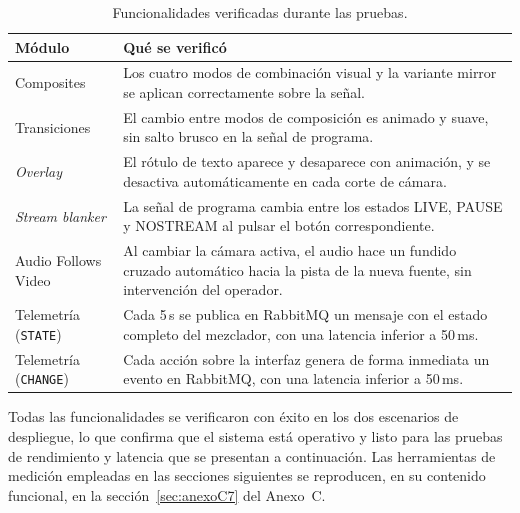 \begin{table}[H]
  \centering
  \caption{Funcionalidades verificadas durante las pruebas.}
  \label{tab:validacion_funcional}
  \small
  \begin{tabular}{|l|p{9cm}|}
    \hline
    \textbf{Módulo} & \textbf{Qué se verificó} \\
    \hline
    Composites
      & Los cuatro modos de combinación visual y la variante mirror se aplican correctamente sobre la señal. \\
    \hline
    Transiciones
      & El cambio entre modos de composición es animado y suave, sin salto brusco en la señal de programa. \\
    \hline
    \textit{Overlay}
      & El rótulo de texto aparece y desaparece con animación, y se desactiva
        automáticamente en cada corte de cámara. \\
    \hline
    \textit{Stream blanker}
      & La señal de programa cambia entre los estados LIVE, PAUSE y NOSTREAM al
        pulsar el botón correspondiente. \\
    \hline
    Audio Follows Video
      & Al cambiar la cámara activa, el audio hace un fundido cruzado automático
        hacia la pista de la nueva fuente, sin intervención del operador. \\
    \hline
    Telemetría (\texttt{STATE})
      & Cada 5\,s se publica en RabbitMQ un mensaje con el estado completo del
        mezclador, con una latencia inferior a 50\,ms. \\
    \hline
    Telemetría (\texttt{CHANGE})
      & Cada acción sobre la interfaz genera de forma inmediata un evento en
        RabbitMQ, con una latencia inferior a 50\,ms. \\
    \hline
  \end{tabular}
\end{table}

Todas las funcionalidades se verificaron con éxito en los dos escenarios de
despliegue, lo que confirma que el sistema está operativo y listo para las
pruebas de rendimiento y latencia que se presentan a continuación.
Las herramientas de medición empleadas en las secciones siguientes
se reproducen, en su contenido funcional, en la sección~\ref{sec:anexoC7} del Anexo~C.
